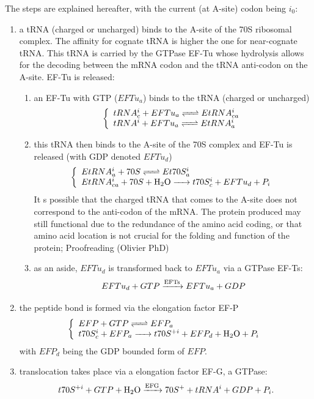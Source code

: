 The steps are explained hereafter, with the current (at A-site) codon being $i_0$:
\begin{enumerate}
  \item a tRNA (charged or uncharged) binds to the A-site of the 70S ribosomal complex. The affinity for cognate tRNA is higher the one for near-cognate tRNA. This tRNA is carried by the GTPase EF-Tu whose hydrolysis allows for the decoding between the mRNA codon and the tRNA anti-codon on the A-site. EF-Tu is released:
      \begin{enumerate}
        \item an EF-Tu with GTP ($EFTu_a$) binds to the tRNA (charged or uncharged)
          $$
            \left\{
            \begin{array}{l}
              \reactionRev{tRNA^i_c + EFTu_a}{EtRNA^i_{ca}}{}{} \\
              \reactionRev{tRNA^i + EFTu_a}{EtRNA^i_{a}}{}{} \\
            \end{array}
          \right.
          $$
        \item this tRNA then binds to the A-site of the 70S complex and EF-Tu is released (with GDP denoted $EFTu_d$)
          $$
            \left\{
            \begin{array}{l}
              \reactionRev{EtRNA^i_{a} + 70S}{Et70S^i_{a}}{}{} \\
              \reactionIrr{EtRNA^i_{ca} + 70S +\ce{H2O}}{t70S^i_{c} + EFTu_d + P_i}{}{} \\
            \end{array}
          \right.
          $$
          It s possible that the charged tRNA that comes to the A-site does not correspond to the anti-codon of the mRNA. The protein produced may still functional due to the redundance of the amino acid coding, or that amino acid location is not crucial for the folding and function of the protein;
          \textcolor[rgb]{1.00,0.00,0.00}{Proofreading (Olivier PhD)}
        \item as an aside, $EFTu_d$ is transformed back to $EFTu_a$ via a GTPase EF-Ts:
          $$
            \reactionIrr{EFTu_d + GTP}{EFTu_a + GDP}{EFTs}{}
          $$
      \end{enumerate}
  \item the peptide bond is formed via the elongation factor EF-P
    $$
      \left\{
        \begin{array}{l}
          \reactionRev{EFP + GTP}{EFP_a}{}{} \\
          \reactionIrr{t70S^i_{c} + EFP_a}{t70S^{+i} + EFP_d + \ce{H2O} + P_i}{}{} \\
        \end{array}
      \right.
    $$
    with $EFP_d$ being the GDP bounded form of $EFP$.
  \item translocation takes place via a elongation factor EF-G, a GTPase:
    $$
      \reactionIrr{t70S^{+i} + GTP+\ce{H2O}}{70S^{+} + tRNA^i + GDP + P_i}{EFG}{}.
    $$
\end{enumerate}



